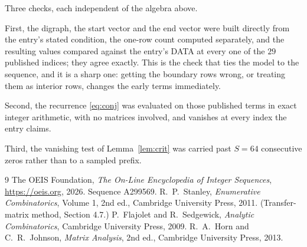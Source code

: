 \documentclass[11pt,a4paper]{article}
\theoremstyle{plain}
\theoremstyle{definition}
\begin{document}
Three checks, each independent of the algebra above.

First, the digraph, the start vector and the end vector were built directly from the
entry's stated condition, the one-row count computed separately, and the resulting values
compared against the entry's DATA at every one of the $29$ published indices; they
agree exactly. This is the check that ties the model to the sequence, and it is a sharp one:
getting the boundary rows wrong, or treating them as interior rows, changes the early terms
immediately.

Second, the recurrence \eqref{eq:conj} was evaluated on those published terms in exact
integer arithmetic, with no matrices involved, and vanishes at every index the entry claims.

Third, the vanishing test of Lemma~\ref{lem:crit} was carried past $S=64$ consecutive
zeros rather than to a sampled prefix.

\begin{thebibliography}{9}
 The OEIS Foundation, \emph{The On-Line Encyclopedia of Integer
Sequences}, \url{https://oeis.org}, 2026. Sequence A299569.
 R.~P.~Stanley, \emph{Enumerative Combinatorics}, Volume 1, 2nd ed.,
Cambridge University Press, 2011. (Transfer-matrix method, Section 4.7.)
 P.~Flajolet and R.~Sedgewick, \emph{Analytic Combinatorics}, Cambridge
University Press, 2009.
 R.~A.~Horn and C.~R.~Johnson, \emph{Matrix Analysis}, 2nd ed., Cambridge
University Press, 2013.
\end{thebibliography}
\end{document}
